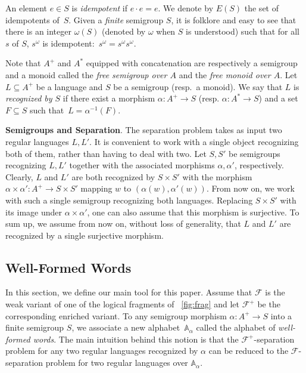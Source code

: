 \documentclass[a4paper,USenglish]{lipics}
\newcommand\Abb{\ensuremath{\mathbb{A}}\xspace}
\newcommand\Fs{\ensuremath{\mathcal{F}}\xspace}
\newcommand\wfA{\ensuremath{\Abb_\alpha}\xspace}
\newcommand\highlight[1]{\par\bigskip\noindent\textbf{\sffamily #1}.}
\theoremstyle{plain}
\begin{document}
An element $e \in S$ is \emph{idempotent} if $e\cdot e=e$. We denote
by $E(S)$ the set of idempotents of~$S$. Given a \emph{finite}
semigroup $S$, it is folklore and easy to see that there is an integer
$\omega(S)$ (denoted by $\omega$ when $S$ is understood) such that for
all $s$ of $S$, $s^\omega$ is idempotent:~$s^\omega=s^\omega s^\omega$.

Note that $A^+$ and $A^*$ equipped with concatenation are respectively a
semigroup and a monoid called the \emph{free semigroup over $A$} and the
\emph{free monoid over $A$}. Let $L \subseteq A^+$ be a language and $S$ be a
semigroup (resp.\ a monoid). We say that $L$ is \emph{recognized by $S$} if there exist
a morphism $\alpha: A^+ \rightarrow S$ (resp. $\alpha: A^* \rightarrow S$) and
a set $F \subseteq S$ such that~$L = \alpha^{-1}(F)$.


\highlight{Semigroups and Separation} The separation problem takes as input
two regular languages $L,L'$. It is convenient to work with a single object
recognizing both of them, rather than having to deal with two. Let $S,S'$ be
semigroups recognizing $L,L'$ together with the associated morphisms
$\alpha, \alpha'$, respectively. Clearly, $L$ and $L'$ are both recognized by
$S \times S'$ with the morphism $\alpha\times \alpha':A^+\to S \times S'$
mapping $w$ to $(\alpha(w),\alpha'(w))$. From now on, we work with such a
single semigroup recognizing both languages. Replacing $S\times S'$ with its
image under $\alpha\times \alpha'$, one can also assume that this morphism is
surjective. To sum up, we assume from now on, without loss of generality, that
$L$ and $L'$ are recognized by a single surjective morphism.


\subsection{Well-Formed Words}
\label{sec:well-formed-words}

In this section, we define our main tool for this paper. Assume that
\Fs is the weak variant of one of the logical fragments of
\figurename~\ref{fig:frag} and let $\Fs^+$ be the corresponding enriched
variant. To any semigroup morphism $\alpha: A^+\to S$ into a finite
semigroup $S$, we associate a new alphabet~$\wfA$ called the alphabet
of \emph{well-formed words}. The main intuition behind this notion is
that the $\Fs^+$-separation problem for any two regular languages recognized
by $\alpha$ can be reduced to the \Fs-separation problem for two
regular languages over $\wfA$.
\end{document}
